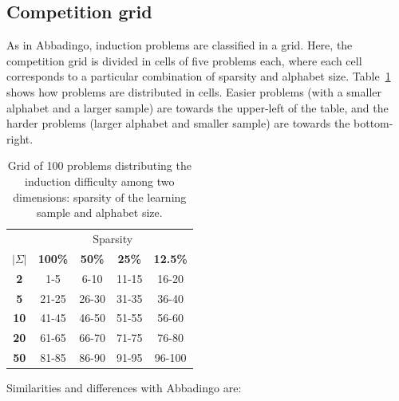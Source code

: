 \subsection{Competition grid}

As in Abbadingo, induction problems are classified in a grid. Here, the competition grid is divided in cells of five problems each, where each cell corresponds to a particular combination of sparsity and alphabet size. Table~\ref{stamina:table:problem-grid} shows how problems are distributed in cells. Easier problems (with a smaller alphabet and a larger sample) are towards the upper-left of the table, and the harder problems (larger alphabet and smaller sample) are towards the bottom-right.

\begin{table}[h]
\begin{center}
\begin{tabular}{c|c c c c}
&\multicolumn{4}{|c}{Sparsity}\\ 
\textbf{$|\Sigma|$} & \textbf{100\%} & \textbf{50\%} & \textbf{25\%} & \textbf{12.5\%}\\
\hline
\textbf{2}  & 1-5   & 6-10  & 11-15 & 16-20 \\
\textbf{5}  & 21-25 & 26-30 & 31-35 & 36-40 \\
\textbf{10} & 41-45 & 46-50 & 51-55 & 56-60 \\
\textbf{20} & 61-65 & 66-70 & 71-75 & 76-80 \\
\textbf{50} & 81-85 & 86-90 & 91-95 & 96-100\\
\end{tabular}
\end{center}
\caption{\label{stamina:table:problem-grid}Grid of 100 problems distributing the induction difficulty among two dimensions: sparsity of the learning sample and alphabet size.}
\end{table}

\noindent Similarities and differences with Abbadingo are:

